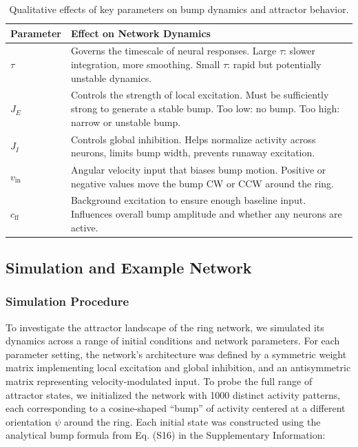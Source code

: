 \documentclass[11pt,a4paper]{article}
\begin{document}
\begin{table}[h!]
\centering
\begin{tabular}{@{}lp{12cm}@{}}
\toprule
\textbf{Parameter} & \textbf{Effect on Network Dynamics} \\
\midrule
\( \tau \) & Governs the timescale of neural responses. Large \( \tau \): slower integration, more smoothing. Small \( \tau \): rapid but potentially unstable dynamics. \\
\( J_E \) & Controls the strength of local excitation. Must be sufficiently strong to generate a stable bump. Too low: no bump. Too high: narrow or unstable bump. \\
\( J_I \) & Controls global inhibition. Helps normalize activity across neurons, limits bump width, prevents runaway excitation. \\
\( v_{\text{in}} \) & Angular velocity input that biases bump motion. Positive or negative values move the bump CW or CCW around the ring. \\
\( c_{\text{ff}} \) & Background excitation to ensure enough baseline input. Influences overall bump amplitude and whether any neurons are active. \\
\bottomrule
\end{tabular}
\caption{Qualitative effects of key parameters on bump dynamics and attractor behavior.}
\end{table}

\subsection{Simulation and Example Network}

\subsubsection*{Simulation Procedure}

To investigate the attractor landscape of the ring network, we simulated its dynamics across a range of initial conditions and network parameters. For each parameter setting, the network’s architecture was defined by a symmetric weight matrix implementing local excitation and global inhibition, and an antisymmetric matrix representing velocity-modulated input. To probe the full range of attractor states, we initialized the network with 1000 distinct activity patterns, each corresponding to a cosine-shaped “bump” of activity centered at a different orientation $\psi$ around the ring. Each initial state was constructed using the analytical bump formula from Eq. (S16) in the Supplementary Information:
\end{document}

